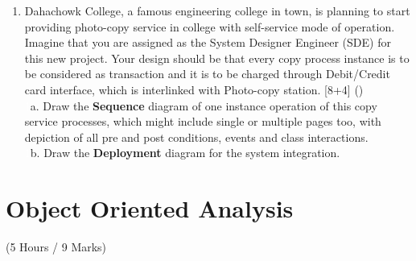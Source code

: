 \documentclass[12pt]{article}
\newcommand{\enter}{\\\textcolor{white}{1}}
\begin{document}
\begin{enumerate}
      \item Dahachowk College, a famous engineering college in town, is planning to start providing photo-copy service in college with self-service mode of operation. Imagine that you are assigned as the System Designer Engineer (SDE) for this new project. Your design should be that every copy process instance is to be considered as transaction and it is to be charged through Debit/Credit card interface, which is interlinked with Photo-copy station. \hfill [8+4] ()
        \enter a. Draw the \textbf{Sequence} diagram of one instance operation of this copy service processes, which might include single or multiple pages too, with depiction of all pre and post conditions, events and class interactions.
        \enter b. Draw the \textbf{Deployment} diagram for the system integration.
    \end{enumerate}

\pagebreak

\section{Object Oriented Analysis}
  \begin{center} (5 Hours / 9 Marks) \end{center}
  
\end{document}
